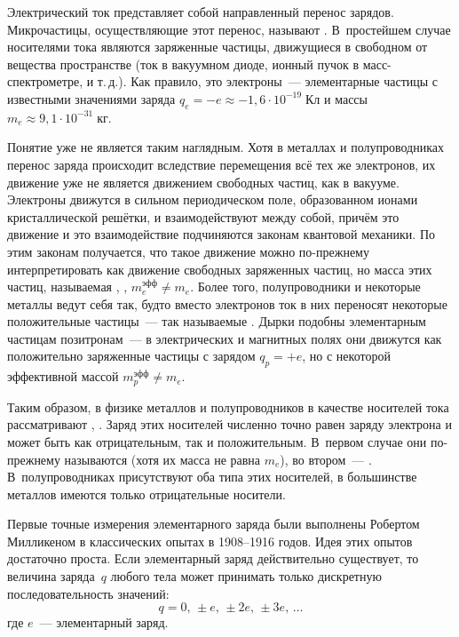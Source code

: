 Электрический ток представляет собой направленный перенос зарядов. Микрочастицы,
осуществляющие этот перенос, называют . В~простейшем
случае носителями тока являются заряженные частицы,
движущиеся в свободном от вещества пространстве (ток в вакуумном диоде,
ионный пучок в масс-спектрометре, и т.\,д.).
Как правило, это электроны~--- элементарные частицы с известными значениями заряда
$q_e=-e\approx-1,6\cdot 10^{-19}\;Кл$
и массы
$m_e\approx 9,1\cdot 10^{-31}\;кг$.

Понятие  уже не является таким наглядным.
Хотя в металлах и полупроводниках перенос заряда происходит
вследствие перемещения всё тех же электронов, их движение уже не является
движением свободных частиц, как в вакууме. Электроны движутся в сильном
периодическом поле, образованном ионами кристаллической решётки, и
взаимодействуют между собой, причём это движение и это взаимодействие
подчиняются законам квантовой механики. По этим законам получается, что такое
движение можно по-прежнему интерпретировать как движение свободных заряженных
частиц, но масса этих частиц, называемая ,
,
$m_{e}^{эфф}\ne m_e$.
Более того, полупроводники и некоторые металлы ведут себя так,
будто вместо электронов ток в них переносят некоторые положительные частицы~---
так называемые . Дырки подобны элементарным
частицам позитронам~--- в электрических и магнитных полях они движутся
как положительно заряженные частицы с зарядом $q_p=+e$,
но с некоторой эффективной массой $m_p^{эфф}\ne m_e$.

Таким образом, в физике металлов и полупроводников в качестве носителей тока
рассматривают ,
.
Заряд этих носителей численно точно равен заряду электрона и может быть как
отрицательным, так и положительным. В~первом случае они по-прежнему называются
 (хотя их масса не равна $m_e$),
во втором~--- . В~полупроводниках присутствуют оба типа этих
носителей, в большинстве металлов имеются только отрицательные носители.

Первые точные измерения элементарного заряда были выполнены Робертом Милликеном
в классических опытах в 1908--1916 годов. Идея этих опытов достаточно проста.
Если элементарный заряд действительно существует, то величина заряда~$q$ любого
тела может принимать только дискретную последовательность значений:
\begin{equation*}
	q = 0,\,\pm e,\,\pm2e,\,\pm3e,\, \ldots
\end{equation*}
где $e$~--- элементарный заряд.

